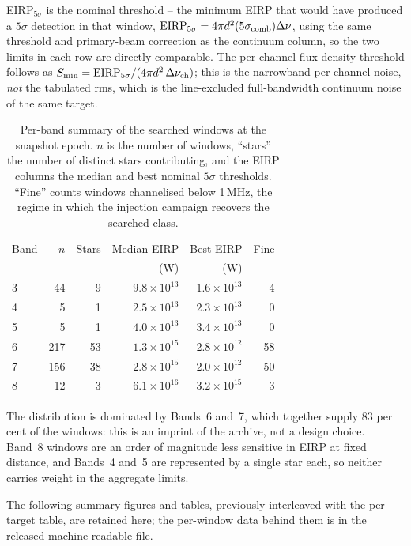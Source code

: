 \documentclass{openjournal}
\begin{document}
EIRP$_{5\sigma}$ is the nominal threshold -- the minimum EIRP that would
have produced a $5\sigma$ detection in that window,
$\mathrm{EIRP_{5\sigma}} = 4\pi d^{2}(5\sigma_{\rm comb})\Delta\nu$,
using the same threshold and primary-beam correction as the continuum
column, so the two limits in each row are directly comparable. The
per-channel flux-density threshold follows as
$S_{\min} = \mathrm{EIRP_{5\sigma}}/(4\pi d^{2}\,\Delta\nu_{\rm ch})$;
this is the narrowband per-channel noise, \emph{not} the tabulated rms,
which is the line-excluded full-bandwidth continuum noise of the same
target.

\begin{table}
\centering
\small
\caption{Per-band summary of the searched windows at the snapshot epoch.
$n$ is the number of windows, ``stars'' the number of distinct stars
contributing, and the EIRP columns the median and best nominal
$5\sigma$ thresholds. ``Fine'' counts windows channelised below
1\,MHz, the regime in which the injection campaign recovers the
searched class.}
\label{tab:bandsummary}
\begin{tabular}{@{}lrrrrr@{}}
\toprule
Band & $n$ & Stars & Median EIRP & Best EIRP & Fine \\
 & & & (W) & (W) & \\
\midrule
3 & 44  & 9  & $9.8\times10^{13}$ & $1.6\times10^{13}$ & 4  \\
4 & 5   & 1  & $2.5\times10^{13}$ & $2.3\times10^{13}$ & 0  \\
5 & 5   & 1  & $4.0\times10^{13}$ & $3.4\times10^{13}$ & 0  \\
6 & 217 & 53 & $1.3\times10^{15}$ & $2.8\times10^{12}$ & 58 \\
7 & 156 & 38 & $2.8\times10^{15}$ & $2.0\times10^{12}$ & 50 \\
8 & 12  & 3  & $6.1\times10^{16}$ & $3.2\times10^{15}$ & 3  \\
\bottomrule
\end{tabular}
\end{table}

The distribution is dominated by Bands~6 and~7, which together supply
83 per cent of the windows: this is an imprint of the archive, not a
design choice. Band~8 windows are an order of magnitude less sensitive
in EIRP at fixed distance, and Bands~4 and~5 are represented by a
single star each, so neither carries weight in the aggregate limits.

The following summary figures and tables, previously interleaved with the
per-target table, are retained here; the per-window data behind them is in
the released machine-readable file.
\end{document}
